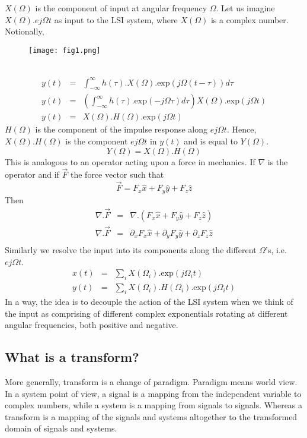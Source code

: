\indent $X(\Omega)$ is the component of input at angular frequency $\Omega$. Let us imagine $X(\Omega).ej\Omega t$ as input to the LSI system, where $X(\Omega)$ is a complex number.\\
Notionally,
\begin{figure}[h!]
\centering
\texttt{[image: fig1.png]}
\end{figure}
\\
\begin{eqnarray}
y(t) &=& \int_{-\infty}^{\infty}h(\tau).X(\Omega).\textrm{exp}(j\Omega (t-\tau))d\tau\\
y(t) &=& \left( \int_{-\infty}^{\infty}h(\tau).\textrm{exp}(-j\Omega \tau)d\tau\right) X(\Omega).\textrm{exp}(j\Omega t)\\
y(t) &=& X(\Omega).H(\Omega).\textrm{exp}(j\Omega t)
\end{eqnarray}
$H(\Omega)$ is the component of the impulse response along $ej\Omega t$. Hence, $X(\Omega).H(\Omega)$ is the component $ej\Omega t$ in $y(t)$ and is equal to $Y(\Omega)$.\\
\begin{equation}
Y(\Omega)=X(\Omega).H(\Omega)
\end{equation}
This is analogous to an operator acting upon a force in mechanics. If $\nabla$ is the operator and if $\vec{F}$ the force vector such that
\begin{equation}
\vec{F}=F_x \hat{x} + F_y \hat{y} + F_z \hat{z}
\end{equation}
Then
\begin{eqnarray}
\nabla . \vec{F} &=& \nabla . (F_x \hat{x} + F_y \hat{y} + F_z \hat{z})\\
\nabla . \vec{F} &=& \partial_x F_x \hat{x} + \partial_y F_y \hat{y} + \partial_z F_z \hat{z}\\
\end{eqnarray}
Similarly we resolve the input into its components along the different $\Omega$'s, i.e. $ej\Omega  t$.
\begin{eqnarray}
x(t)&=&\sum_i X(\Omega_i).\textrm{exp}(j\Omega_i t)\\
y(t)&=&\sum _i X(\Omega_i).H(\Omega_i).\textrm{exp}(j\Omega_i t)
\end{eqnarray}
In a way, the idea is to decouple the action of the LSI system when we think of the input as comprising of different complex exponentials rotating at different angular frequencies, both positive and negative.
\subsection{What is a transform?}
More generally, transform is a change of paradigm. Paradigm means world view. In a system point of view, a signal is a mapping from the independent variable to complex numbers, while a system is a mapping from signals to signals. Whereas a transform is a mapping of the signals and systems altogether to the transformed domain of signals and systems.
